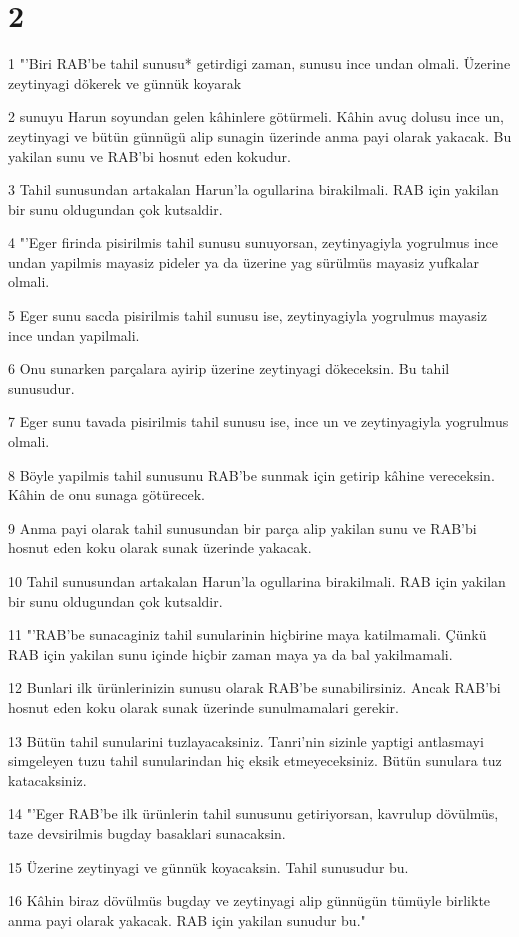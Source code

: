 \chapter{2}

\par 1 "'Biri RAB'be tahil sunusu* getirdigi zaman, sunusu ince undan olmali. Üzerine zeytinyagi dökerek ve günnük koyarak
\par 2 sunuyu Harun soyundan gelen kâhinlere götürmeli. Kâhin avuç dolusu ince un, zeytinyagi ve bütün günnügü alip sunagin üzerinde anma payi olarak yakacak. Bu yakilan sunu ve RAB'bi hosnut eden kokudur.
\par 3 Tahil sunusundan artakalan Harun'la ogullarina birakilmali. RAB için yakilan bir sunu oldugundan çok kutsaldir.
\par 4 "'Eger firinda pisirilmis tahil sunusu sunuyorsan, zeytinyagiyla yogrulmus ince undan yapilmis mayasiz pideler ya da üzerine yag sürülmüs mayasiz yufkalar olmali.
\par 5 Eger sunu sacda pisirilmis tahil sunusu ise, zeytinyagiyla yogrulmus mayasiz ince undan yapilmali.
\par 6 Onu sunarken parçalara ayirip üzerine zeytinyagi dökeceksin. Bu tahil sunusudur.
\par 7 Eger sunu tavada pisirilmis tahil sunusu ise, ince un ve zeytinyagiyla yogrulmus olmali.
\par 8 Böyle yapilmis tahil sunusunu RAB'be sunmak için getirip kâhine vereceksin. Kâhin de onu sunaga götürecek.
\par 9 Anma payi olarak tahil sunusundan bir parça alip yakilan sunu ve RAB'bi hosnut eden koku olarak sunak üzerinde yakacak.
\par 10 Tahil sunusundan artakalan Harun'la ogullarina birakilmali. RAB için yakilan bir sunu oldugundan çok kutsaldir.
\par 11 "'RAB'be sunacaginiz tahil sunularinin hiçbirine maya katilmamali. Çünkü RAB için yakilan sunu içinde hiçbir zaman maya ya da bal yakilmamali.
\par 12 Bunlari ilk ürünlerinizin sunusu olarak RAB'be sunabilirsiniz. Ancak RAB'bi hosnut eden koku olarak sunak üzerinde sunulmamalari gerekir.
\par 13 Bütün tahil sunularini tuzlayacaksiniz. Tanri'nin sizinle yaptigi antlasmayi simgeleyen tuzu tahil sunularindan hiç eksik etmeyeceksiniz. Bütün sunulara tuz katacaksiniz.
\par 14 "'Eger RAB'be ilk ürünlerin tahil sunusunu getiriyorsan, kavrulup dövülmüs, taze devsirilmis bugday basaklari sunacaksin.
\par 15 Üzerine zeytinyagi ve günnük koyacaksin. Tahil sunusudur bu.
\par 16 Kâhin biraz dövülmüs bugday ve zeytinyagi alip günnügün tümüyle birlikte anma payi olarak yakacak. RAB için yakilan sunudur bu."

